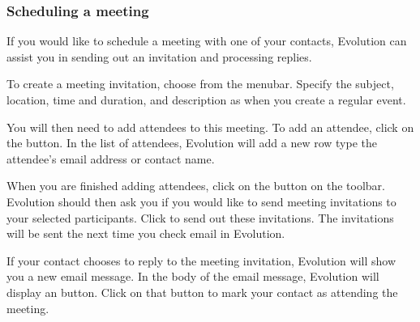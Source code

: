  \subsubsection{Scheduling a meeting}

If you would like to schedule a meeting with one of your contacts, Evolution
can assist you in sending out an invitation and processing replies.

To create a meeting invitation, choose 
from the menubar. Specify the subject, location, time and duration, and 
description as when you create a regular event. 

You will then need to add attendees to this meeting. To add an attendee,
click on the  button. In the list of attendees, Evolution will
add a new row \dash type the attendee's email address or contact name.

When you are finished adding attendees, click on the  button on
the toolbar. Evolution should then ask you if you would like to send meeting
invitations to your selected participants. Click  to send out
these invitations. The invitations will be sent the next time you check
email in Evolution.

If your contact chooses to reply to the meeting invitation, Evolution will
show you a new email message. In the body of the email message, Evolution will
display an  button. Click on that button to
mark your contact as attending the meeting.


